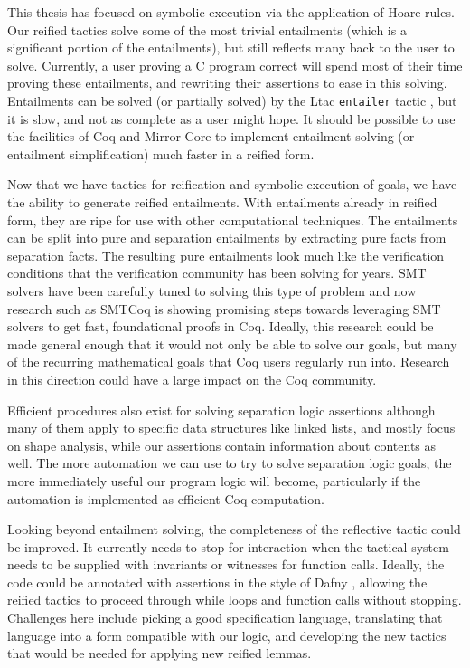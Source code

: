 \documentclass{puthesis}
\begin{document}
This thesis has focused on symbolic execution via the application of
Hoare rules.  Our reified tactics solve some of the most trivial
entailments (which is a significant portion of the entailments), but
still reflects many back to the user to solve. Currently, a user
proving a C program correct will spend most of their time proving
these entailments, and rewriting their assertions to ease in this
solving. Entailments can be solved (or partially solved) by the Ltac
\lstinline|entailer| tactic \cite[Chapter 26]{appel14:plcc}, but it is slow,
and not as complete as a user might hope.  It should be possible to
use the facilities of Coq and Mirror Core to implement
entailment-solving (or entailment simplification) much faster in a
reified form.

Now that we have tactics for reification and symbolic execution of
goals, we have the ability to generate reified entailments.  With
entailments already in reified form, they are ripe for use with other
computational techniques. The entailments can be split into pure and
separation entailments by extracting pure facts from separation
facts. The resulting pure entailments look much like the verification
conditions that the verification community has been solving for
years. SMT solvers have been carefully tuned to solving this type of
problem and now research such as SMTCoq \cite{smtcoq} is showing
promising steps towards leveraging SMT solvers to get fast,
foundational proofs in Coq. Ideally, this research could be made
general enough that it would not only be able to solve our goals, but
many of the recurring mathematical goals that Coq users regularly run
into. Research in this direction could have a large impact on the Coq
community.

Efficient procedures also exist for solving separation logic
assertions \cite{DBLP:conf/vmcai/NguyenDQC07,
  Brotherston-Distefano-Petersen:11, navarro11, cook11} although many
of them apply to specific data structures like linked lists, and
mostly focus on shape analysis, while our assertions contain
information about contents as well. The more automation we can use to
try to solve separation logic goals, the more immediately useful our
program logic will become, particularly if the automation is
implemented as efficient Coq computation.

Looking beyond entailment solving, the completeness of the reflective
tactic could be improved. It currently needs to stop for interaction
when the tactical system needs to be supplied with invariants or
witnesses for function calls. Ideally, the code could be annotated
with assertions in the style of Dafny \cite{leino2010dafny}, allowing
the reified tactics to proceed through while loops and function calls
without stopping. Challenges here include picking a good specification
language, translating that language into a form compatible with our
logic, and developing the new tactics that would be needed for
applying new reified lemmas. 
\end{document}
